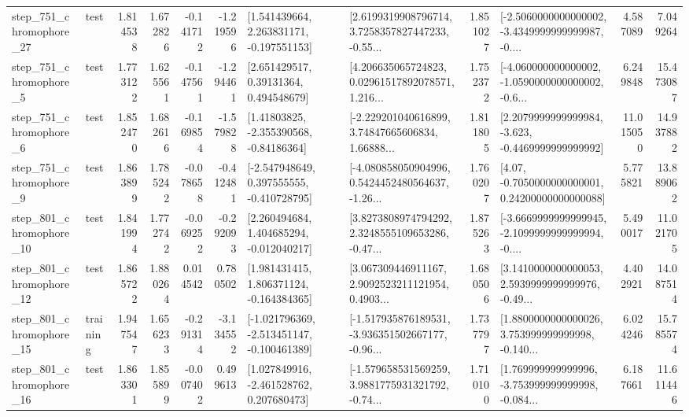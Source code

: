 \begin{tabular}{llrrrrllrlrr}
  step\_751\_chromophore\_27 &      test &      1.814538 &    1.672826 &     -0.141712 & -1.219596 &    [1.541439664, 2.263831171, -0.197551153] &  [2.6199319908796714, 3.7258357827447233, -0.55... &       1.851027 &  [-2.5060000000000002, -3.4349999999999987, -0.... &            4.587089 &          7.049264 \\
   step\_751\_chromophore\_5 &      test &      1.773122 &    1.625561 &     -0.147561 & -1.294461 &      [2.651429517, 0.39131364, 0.494548679] &  [4.206635065724823, 0.02961517892078571, 1.216... &       1.752372 &  [-4.060000000000002, -1.0590000000000002, -0.6... &            6.249848 &         15.473087 \\
   step\_751\_chromophore\_6 &      test &      1.852470 &    1.682616 &     -0.169854 & -1.579828 &     [1.41803825, -2.355390568, -0.84186364] &  [-2.229201040616899, 3.74847665606834, 1.66888... &       1.811805 &  [2.2079999999999984, -3.623, -0.4469999999999992] &           11.015050 &         14.937882 \\
   step\_751\_chromophore\_9 &      test &      1.863899 &    1.785242 &     -0.078658 & -0.412481 &   [-2.547948649, 0.397555555, -0.410728795] &  [-4.080858050904996, 0.5424452480564637, -1.26... &       1.760207 &   [4.07, -0.7050000000000001, 0.24200000000000088] &            5.775821 &         13.889062 \\
  step\_801\_chromophore\_10 &      test &      1.841994 &    1.772742 &     -0.069252 & -0.292093 &    [2.260494684, 1.404685294, -0.012040217] &  [3.8273808974794292, 2.3248555109653286, -0.47... &       1.875263 &  [-3.6669999999999945, -2.1099999999999994, -0.... &            5.490017 &         11.021705 \\
  step\_801\_chromophore\_12 &      test &      1.865722 &    1.880264 &      0.014542 &  0.780502 &    [1.981431415, 1.806371124, -0.164384365] &  [3.067309446911167, 2.9092523211121954, 0.4903... &       1.680506 &  [3.1410000000000053, 2.5939999999999976, -0.49... &            4.402921 &         14.087514 \\
  step\_801\_chromophore\_15 &  training &      1.947547 &    1.656233 &     -0.291314 & -3.134552 &  [-1.021796369, -2.513451147, -0.100461389] &  [-1.517935876189531, -3.936351502667177, -0.96... &       1.737797 &  [1.8800000000000026, 3.753999999999998, -0.140... &            6.024246 &         15.785574 \\
  step\_801\_chromophore\_16 &      test &      1.863301 &    1.855899 &     -0.007402 &  0.499613 &    [1.027849916, -2.461528762, 0.207680473] &  [-1.579658531569259, 3.9881775931321792, -0.74... &       1.710100 &  [1.769999999999996, -3.753999999999998, -0.084... &            6.187661 &         11.611446 \\

\end{tabular}
